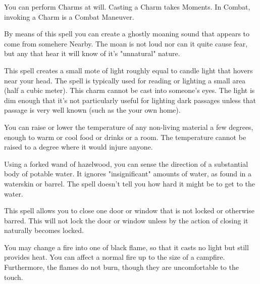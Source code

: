 {\newpage



  You can perform Charms at will.  Casting a Charm takes Moments.  In Combat, invoking a Charm is a Combat Maneuver.



  By means of this spell you can create a ghostly moaning sound that appears to come from somehere Nearby. The moan is not loud nor can it quite cause fear, but any that hear it will know of it's "unnatural" nature. 


  This spell creates a small mote of light roughly equal to candle light that hovers near your head. The spell is typically used for reading or lighting a small area (half a cubic meter). This charm cannot be cast into someone's eyes. The light is dim enough that it's not particularly useful for lighting dark passages unless that passage is very well known (such as the your own home). 


  You can raise or lower the temperature of any non-living material a few degrees, enough to warm or cool food or drinks or a room.  The temperature cannot be raised to a degree where it would injure anyone.



  Using a forked wand of hazelwood, you can sense the direction of a substantial body of potable water.  It ignores "insignificant" amounts of water, as found in a waterskin or barrel.  The spell doesn’t tell you how hard it might be to get to the water.


  This spell allows you to close one door or window that is not locked or otherwise barred. This will not lock the door or window unless by the action of closing it naturally becomes locked. 


  You may change a fire into one of black flame, so that it casts no light but still provides heat.  You can affect a normal fire up to the size of a campfire.  Furthermore, the flames do not burn, though they are uncomfortable to the touch.


}
